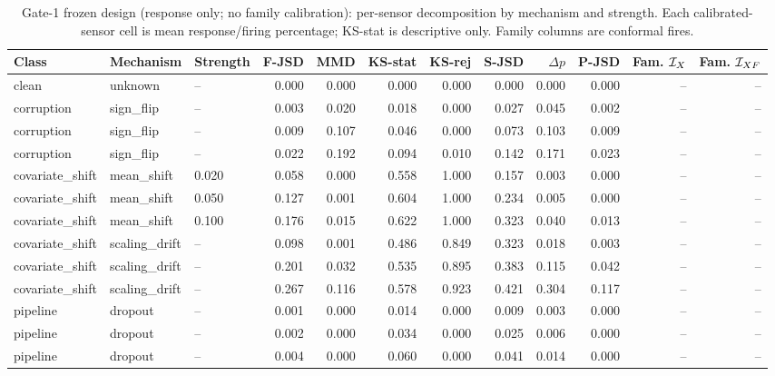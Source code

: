 \begin{table}[!t]
\caption{Gate-1 frozen design (response only; no family calibration): per-sensor decomposition by mechanism and strength. Each calibrated-sensor cell is mean response/firing percentage; KS-stat is descriptive only. Family columns are conformal fires.}
\label{tab:v137-decomp-6}
\centering\scriptsize\renewcommand{\arraystretch}{0.94}\setlength{\tabcolsep}{2.1pt}
\begin{tabular}{@{}lllrrrrrrrrr@{}}
\toprule
Class & Mechanism & Strength & F-JSD & MMD & KS-stat & KS-rej & S-JSD & $\Delta p$ & P-JSD & Fam. $\mathcal I_X$ & Fam. $\mathcal I_{XF}$ \\
\midrule
clean & unknown & -- & 0.000 & 0.000 & 0.000 & 0.000 & 0.000 & 0.000 & 0.000 & -- & -- \\
corruption & sign\_flip & -- & 0.003 & 0.020 & 0.018 & 0.000 & 0.027 & 0.045 & 0.002 & -- & -- \\
corruption & sign\_flip & -- & 0.009 & 0.107 & 0.046 & 0.000 & 0.073 & 0.103 & 0.009 & -- & -- \\
corruption & sign\_flip & -- & 0.022 & 0.192 & 0.094 & 0.010 & 0.142 & 0.171 & 0.023 & -- & -- \\
covariate\_shift & mean\_shift & 0.020 & 0.058 & 0.000 & 0.558 & 1.000 & 0.157 & 0.003 & 0.000 & -- & -- \\
covariate\_shift & mean\_shift & 0.050 & 0.127 & 0.001 & 0.604 & 1.000 & 0.234 & 0.005 & 0.000 & -- & -- \\
covariate\_shift & mean\_shift & 0.100 & 0.176 & 0.015 & 0.622 & 1.000 & 0.323 & 0.040 & 0.013 & -- & -- \\
covariate\_shift & scaling\_drift & -- & 0.098 & 0.001 & 0.486 & 0.849 & 0.323 & 0.018 & 0.003 & -- & -- \\
covariate\_shift & scaling\_drift & -- & 0.201 & 0.032 & 0.535 & 0.895 & 0.383 & 0.115 & 0.042 & -- & -- \\
covariate\_shift & scaling\_drift & -- & 0.267 & 0.116 & 0.578 & 0.923 & 0.421 & 0.304 & 0.117 & -- & -- \\
pipeline & dropout & -- & 0.001 & 0.000 & 0.014 & 0.000 & 0.009 & 0.003 & 0.000 & -- & -- \\
pipeline & dropout & -- & 0.002 & 0.000 & 0.034 & 0.000 & 0.025 & 0.006 & 0.000 & -- & -- \\
pipeline & dropout & -- & 0.004 & 0.000 & 0.060 & 0.000 & 0.041 & 0.014 & 0.000 & -- & -- \\
\bottomrule
\end{tabular}
\end{table}

